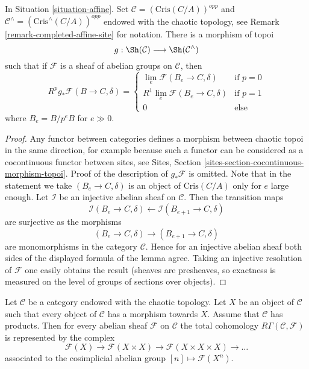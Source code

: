 \begin{lemma}
\label{lemma-complete}
In Situation \ref{situation-affine}.
Set $\mathcal{C} = (\text{Cris}(C/A))^{opp}$ and
$\mathcal{C}^\wedge = (\text{Cris}^\wedge(C/A))^{opp}$
endowed with the chaotic topology, see
Remark \ref{remark-completed-affine-site} for notation.
There is a morphism of topoi
$$
g : \Sh(\mathcal{C}) \longrightarrow \Sh(\mathcal{C}^\wedge)
$$
such that if $\mathcal{F}$ is a sheaf of abelian groups on
$\mathcal{C}$, then
$$
R^pg_*\mathcal{F}(B \to C, \delta) =
\left\{
\begin{matrix}
\lim_e \mathcal{F}(B_e \to C, \delta) & \text{if }p = 0 \\
R^1\lim_e \mathcal{F}(B_e \to C, \delta) & \text{if }p = 1 \\
0 & \text{else}
\end{matrix}
\right.
$$
where $B_e = B/p^eB$ for $e \gg 0$.
\end{lemma}

\begin{proof}
Any functor between categories defines a morphism between chaotic
topoi in the same direction, for example because such a functor
can be considered as a cocontinuous functor between sites, see
Sites, Section \ref{sites-section-cocontinuous-morphism-topoi}.
Proof of the description of $g_*\mathcal{F}$ is omitted.
Note that in the statement we take $(B_e \to C, \delta)$
is an object of $\text{Cris}(C/A)$  only for $e$ large enough.
Let $\mathcal{I}$ be an injective abelian sheaf on $\mathcal{C}$.
Then the transition maps
$$
\mathcal{I}(B_e \to C, \delta) \leftarrow
\mathcal{I}(B_{e + 1} \to C, \delta)
$$
are surjective as the morphisms
$$
(B_e \to C, \delta)
\longrightarrow
(B_{e + 1} \to C, \delta)
$$
are monomorphisms in the category $\mathcal{C}$. Hence for an injective
abelian sheaf both sides of the displayed formula of the lemma agree.
Taking an injective resolution of $\mathcal{F}$ one easily obtains
the result (sheaves are presheaves, so exactness is measured on the
level of groups of sections over objects).
\end{proof}

\begin{lemma}
\label{lemma-category-with-covering}
Let $\mathcal{C}$ be a category endowed with the chaotic topology.
Let $X$ be an object of $\mathcal{C}$ such that every object of
$\mathcal{C}$ has a morphism towards $X$. Assume that $\mathcal{C}$
has products. Then for every abelian sheaf $\mathcal{F}$ on $\mathcal{C}$
the total cohomology $R\Gamma(\mathcal{C}, \mathcal{F})$ is represented
by the complex
$$
\mathcal{F}(X) \to \mathcal{F}(X \times X) \to
\mathcal{F}(X \times X \times X) \to \ldots
$$
associated to the cosimplicial abelian group $[n] \mapsto \mathcal{F}(X^n)$.
\end{lemma}


